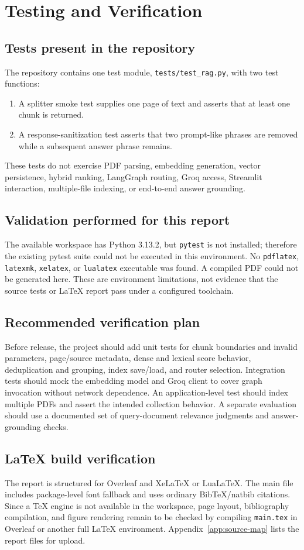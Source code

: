 \chapter{Testing and Verification}
\label{ch:testing}

\section{Tests present in the repository}
The repository contains one test module, \texttt{tests/test\_rag.py}, with two test functions:
\begin{enumerate}
  \item A splitter smoke test supplies one page of text and asserts that at least one chunk is returned.
  \item A response-sanitization test asserts that two prompt-like phrases are removed while a subsequent answer phrase remains.
\end{enumerate}
These tests do not exercise PDF parsing, embedding generation, vector persistence, hybrid ranking, LangGraph routing, Groq access, Streamlit interaction, multiple-file indexing, or end-to-end answer grounding.

\section{Validation performed for this report}
The available workspace has Python 3.13.2, but \texttt{pytest} is not installed; therefore the existing pytest suite could not be executed in this environment. No \texttt{pdflatex}, \texttt{latexmk}, \texttt{xelatex}, or \texttt{lualatex} executable was found. A compiled PDF could not be generated here. These are environment limitations, not evidence that the source tests or LaTeX report pass under a configured toolchain.

\section{Recommended verification plan}
Before release, the project should add unit tests for chunk boundaries and invalid parameters, page/source metadata, dense and lexical score behavior, deduplication and grouping, index save/load, and router selection. Integration tests should mock the embedding model and Groq client to cover graph invocation without network dependence. An application-level test should index multiple PDFs and assert the intended collection behavior. A separate evaluation should use a documented set of query-document relevance judgments and answer-grounding checks.

\section{LaTeX build verification}
The report is structured for Overleaf and XeLaTeX or LuaLaTeX. The main file includes package-level font fallback and uses ordinary BibTeX/natbib citations. Since a TeX engine is not available in the workspace, page layout, bibliography compilation, and figure rendering remain to be checked by compiling \texttt{main.tex} in Overleaf or another full LaTeX environment. Appendix~\ref{app:source-map} lists the report files for upload.

